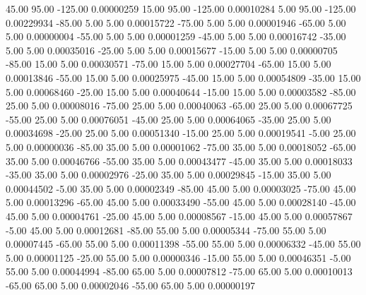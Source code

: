      45.00     95.00   -125.00     0.00000259
     15.00     95.00   -125.00     0.00010284
      5.00     95.00   -125.00     0.00229934
    -85.00      5.00      5.00     0.00015722
    -75.00      5.00      5.00     0.00001946
    -65.00      5.00      5.00     0.00000004
    -55.00      5.00      5.00     0.00001259
    -45.00      5.00      5.00     0.00016742
    -35.00      5.00      5.00     0.00035016
    -25.00      5.00      5.00     0.00015677
    -15.00      5.00      5.00     0.00000705
    -85.00     15.00      5.00     0.00030571
    -75.00     15.00      5.00     0.00027704
    -65.00     15.00      5.00     0.00013846
    -55.00     15.00      5.00     0.00025975
    -45.00     15.00      5.00     0.00054809
    -35.00     15.00      5.00     0.00068460
    -25.00     15.00      5.00     0.00040644
    -15.00     15.00      5.00     0.00003582
    -85.00     25.00      5.00     0.00008016
    -75.00     25.00      5.00     0.00040063
    -65.00     25.00      5.00     0.00067725
    -55.00     25.00      5.00     0.00076051
    -45.00     25.00      5.00     0.00064065
    -35.00     25.00      5.00     0.00034698
    -25.00     25.00      5.00     0.00051340
    -15.00     25.00      5.00     0.00019541
     -5.00     25.00      5.00     0.00000036
    -85.00     35.00      5.00     0.00001062
    -75.00     35.00      5.00     0.00018052
    -65.00     35.00      5.00     0.00046766
    -55.00     35.00      5.00     0.00043477
    -45.00     35.00      5.00     0.00018033
    -35.00     35.00      5.00     0.00002976
    -25.00     35.00      5.00     0.00029845
    -15.00     35.00      5.00     0.00044502
     -5.00     35.00      5.00     0.00002349
    -85.00     45.00      5.00     0.00003025
    -75.00     45.00      5.00     0.00013296
    -65.00     45.00      5.00     0.00033490
    -55.00     45.00      5.00     0.00028140
    -45.00     45.00      5.00     0.00004761
    -25.00     45.00      5.00     0.00008567
    -15.00     45.00      5.00     0.00057867
     -5.00     45.00      5.00     0.00012681
    -85.00     55.00      5.00     0.00005344
    -75.00     55.00      5.00     0.00007445
    -65.00     55.00      5.00     0.00011398
    -55.00     55.00      5.00     0.00006332
    -45.00     55.00      5.00     0.00001125
    -25.00     55.00      5.00     0.00000346
    -15.00     55.00      5.00     0.00046351
     -5.00     55.00      5.00     0.00044994
    -85.00     65.00      5.00     0.00007812
    -75.00     65.00      5.00     0.00010013
    -65.00     65.00      5.00     0.00002046
    -55.00     65.00      5.00     0.00000197
